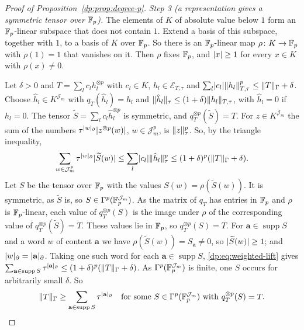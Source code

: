 \begin{proof}[Proof of Proposition~\ref{dp:prop:degree-p}]
\emph{Step 3 (a representation gives a symmetric tensor over $\mathbb F_p$).} The elements of $K$ of absolute value below $1$ form an $\mathbb F_p$\nobreakdash-linear subspace that does not contain $1$. Extend a basis of this subspace, together with $1$, to a basis of $K$ over $\mathbb F_p$. So there is an $\mathbb F_p$\nobreakdash-linear map $\rho\colon K\to\mathbb F_p$ with $\rho(1)=1$ that vanishes on it. Then $\rho$ fixes $\mathbb F_p$, and $\lvert x\rvert\ge1$ for every $x\in K$ with $\rho(x)\ne0$.

Let $\delta>0$ and $T=\sum_lc_lh_l^{\otimes p}$ with $c_l\in K$, $h_l\in\mathcal E_{T,\tau}$ and $\sum_l\lvert c_l\rvert\lVert h_l\rVert_{T,\tau}^p\le\lVert T\rVert_\Gamma+\delta$. Choose $\hat h_l\in K^{\mathcal J_m}$ with $q_T(\hat h_l)=h_l$ and $\lVert \hat h_l\rVert_\tau\le(1+\delta)\lVert h_l\rVert_{T,\tau}$, with $\hat h_l=0$ if $h_l=0$. The tensor $\widetilde S=\sum_lc_l\hat h_l^{\otimes p}$ is symmetric, and $q_T^{\otimes p}(\widetilde S)=T$. For $z\in K^{\mathcal J_m}$ the sum of the numbers $\tau^{\lvert w\rvert_\partial}\lvert z^{\otimes p}(w)\rvert$, $w\in\mathcal J_m^p$, is $\lVert z\rVert_\tau^p$. So, by the triangle inequality,
\begin{equation}\label{dp:eq:weighted-lift}
 \sum_{w\in\mathcal J_m^p}\tau^{\lvert w\rvert_\partial}\lvert \widetilde S(w)\rvert\le\sum_l\lvert c_l\rvert\lVert \hat h_l\rVert_\tau^p\le(1+\delta)^p(\lVert T\rVert_\Gamma+\delta).
\end{equation}
Let $S$ be the tensor over $\mathbb F_p$ with the values $S(w)=\rho(\widetilde S(w))$. It is symmetric, as $\widetilde S$ is, so $S\in\Gamma^p(\mathbb F_p^{\mathcal J_m})$. As the matrix of $q_T$ has entries in $\mathbb F_p$ and $\rho$ is $\mathbb F_p$\nobreakdash-linear, each value of $q_T^{\otimes p}(S)$ is the image under $\rho$ of the corresponding value of $q_T^{\otimes p}(\widetilde S)=T$. These values lie in $\mathbb F_p$, so $q_T^{\otimes p}(S)=T$. For $\mathbf a\in\operatorname{supp}S$ and a word $w$ of content $\mathbf a$ we have $\rho(\widetilde S(w))=S_{\mathbf a}\ne0$, so $\lvert \widetilde S(w)\rvert\ge1$; and $\lvert w\rvert_\partial=\lvert \mathbf a\rvert_\partial$. Taking one such word for each $\mathbf a\in\operatorname{supp}S$, \eqref{dp:eq:weighted-lift} gives $\sum_{\mathbf a\in\operatorname{supp}S}\tau^{\lvert \mathbf a\rvert_\partial}\le(1+\delta)^p(\lVert T\rVert_\Gamma+\delta)$. As $\Gamma^p(\mathbb F_p^{\mathcal J_m})$ is finite, one $S$ occurs for arbitrarily small $\delta$. So
\begin{equation}\label{dp:eq:support-bound}
 \lVert T\rVert_\Gamma\ge\sum_{\mathbf a\in\operatorname{supp}S}\tau^{\lvert \mathbf a\rvert_\partial}\quad\text{for some }S\in\Gamma^p(\mathbb F_p^{\mathcal J_m})\text{ with }q_T^{\otimes p}(S)=T.
\end{equation}


\end{proof}
